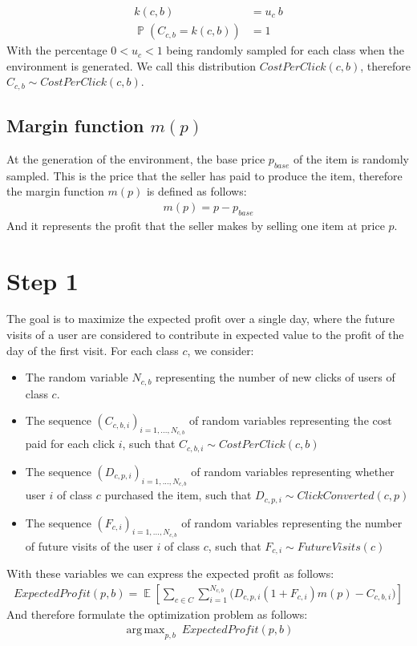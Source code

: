 \documentclass[11pt]{article} %
\DeclareMathOperator{\EX}{\mathbb{E}}
\DeclareMathOperator{\Prob}{\mathbb{P}}
\DeclareMathOperator*{\argmax}{arg\,max}
\begin{document}
\begin{align*}
k(c,b) &= u_c\  b\\
\Prob(C_{c,b} = k(c,b)) &= 1
\end{align*}
With the percentage $0 < u_c < 1$ being randomly sampled for each class when the environment is generated.
We call this distribution $CostPerClick(c,b)$, therefore $C_{c,b}\sim CostPerClick(c,b)$.

\subsection{Margin function $m(p)$}
At the generation of the environment, the base price $p_{base}$ of the item is randomly sampled. This is the price that the seller has paid to produce the item, therefore the margin function $m(p)$ is defined as follows:
\begin{align*}
m(p)=p-p_{base}
\end{align*}
And it represents the profit that the seller makes by selling one item at price $p$.

\clearpage
\section{Step 1}
The goal is to maximize the expected profit over a single day, where the future visits of a user are considered to contribute in expected value to the profit of the day of the first visit.
\newline
\newline
For each class $c$, we consider:
\begin{itemize}
\item The random variable $N_{c,b}$ representing the number of new clicks of users of class $c$.
\item The sequence $(C_{c,b,i})_{i=1,...,N_{c,b}}$ of random variables representing the cost paid for each click $i$, such that $C_{c,b,i}\sim CostPerClick(c,b)$
\item The sequence $(D_{c,p,i})_{i=1,...,N_{c,b}}$ of random variables representing whether user $i$ of class $c$ purchased the item, such that $D_{c,p,i}\sim ClickConverted(c,p)$
\item The sequence $(F_{c,i})_{i=1,...,N_{c,b}}$ of random variables representing the number of future visits of the user $i$ of class $c$, such that $F_{c,i}\sim FutureVisits(c)$
\end{itemize}
With these variables we can express the expected profit as follows:
\begin{align*}
ExpectedProfit(p,b) = \EX\left[\sum_{c \in C}{\sum_{i =1}^{N_{c,b}}{\bigg( D_{c,p,i}(1+F_{c,i})m(p)-C_{c,b,i}\bigg)}}\right]
\end{align*}
And therefore formulate the optimization problem as follows:
\begin{align*}
\argmax_{p,b}{\ ExpectedProfit(p,b)}
\end{align*}
\end{document}
